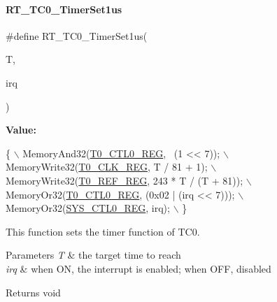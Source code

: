 \paragraph{\texorpdfstring{R\+T\+\_\+\+T\+C0\+\_\+\+Timer\+Set1us}{RT\_TC0\_TimerSet1us}}
{\footnotesize\ttfamily \#define R\+T\+\_\+\+T\+C0\+\_\+\+Timer\+Set1us(\begin{DoxyParamCaption}\item[{}]{T,  }\item[{}]{irq }\end{DoxyParamCaption})}

{\bfseries Value\+:}
\begin{DoxyCode}
\{                                                  \(\backslash\)
        MemoryAnd32(\mbox{\hyperlink{a00020_ac94b0659ef32086a6752672082c0b3ed}{T0\_CTL0\_REG}}, ~(1 << 7));           \(\backslash\)
        MemoryWrite32(\mbox{\hyperlink{a00020_a02a329d71e5fe86e9a0a8513ea5e1630}{T0\_CLK\_REG}}, T / 81 + 1);         \(\backslash\)
        MemoryWrite32(\mbox{\hyperlink{a00020_a857679d0d1c771053cac56dc76c38caa}{T0\_REF\_REG}}, 243 * T / (T + 81)); \(\backslash\)
        MemoryOr32(\mbox{\hyperlink{a00020_ac94b0659ef32086a6752672082c0b3ed}{T0\_CTL0\_REG}}, (0x02 | (irq << 7)));  \(\backslash\)
        MemoryOr32(\mbox{\hyperlink{a00020_ab34acec79daf4fcc12a662cde9e75df7}{SYS\_CTL0\_REG}}, irq);                 \(\backslash\)
    \}
\end{DoxyCode}


This function sets the timer function of T\+C0. 


\begin{DoxyParams}{Parameters}
{\em T} & the target time to reach \\
\hline
{\em irq} & when ON, the interrupt is enabled; when O\+FF, disabled \\
\hline
\end{DoxyParams}
\begin{DoxyReturn}{Returns}
void 
\end{DoxyReturn}
